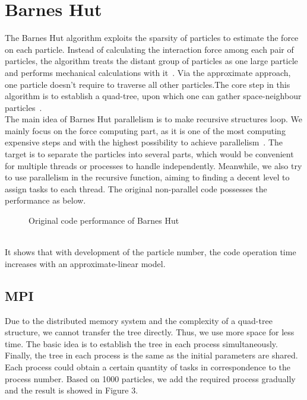 \documentclass{scrartcl}
\begin{document}
\section{Barnes Hut}
The Barnes Hut algorithm exploits the sparsity of particles to estimate the force on each particle. Instead of calculating the interaction force among each pair of particles, the algorithm treats the distant group of particles as one large particle and performs mechanical calculations with it~\cite{van2013barnes}. Via the approximate approach, one particle doesn't require to traverse all other particles.The core step in this algorithm is to establish a quad-tree, upon which one can gather space-neighbour particles~\cite{smith1994quad}.\\
The main idea of Barnes Hut parallelism is to make recursive structures loop. We mainly focus on the force computing part, as it is one of the most computing expensive steps and with the highest possibility to achieve parallelism~\cite{arnautovic2013parallelization}. The target is to separate the particles into several parts, which would be convenient for multiple threads or processes to handle independently. Meanwhile, we also try to use parallelism in the recursive function, aiming to finding a 
decent level to assign tasks to each thread.
The original non-parallel code possesses the performance as below.\\
\begin{figure}[!h]
\centering

\caption{Original code performance of Barnes Hut}
\label{fig:name}
\end{figure}
\\It shows that with development of the particle number, the code operation time increases with an approximate-linear model. 

\subsection{MPI}
\noindent
Due to the distributed memory system and the complexity of a quad-tree structure, we cannot transfer the tree directly. Thus, we use more space for less time. The basic idea is to establish the tree in each process simultaneously. Finally, the tree in each process is the same as the initial parameters are shared. Each process could obtain a certain quantity of tasks in correspondence to the process number. Based on 1000 particles, we add the required process gradually and the result is showed in Figure 3.
\end{document}
